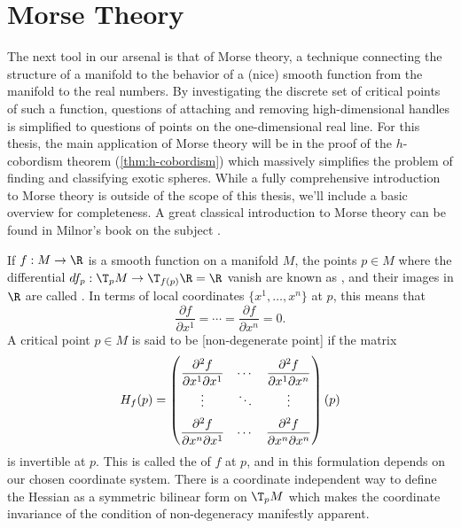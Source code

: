 \pagebreak
\section{Morse Theory}\label{sec:morse-theory}

The next tool in our arsenal is that of Morse theory, a technique connecting the structure of a manifold to the behavior of a (nice) smooth function from the manifold to the real numbers. 
By investigating the discrete set of critical points of such a function, questions of attaching and removing high-dimensional handles is simplified to questions of points on the one-dimensional real line. For this thesis, the main application of Morse theory will be in the proof of the $h$-cobordism theorem (\cref{thm:h-cobordism}) which massively simplifies the problem of finding and classifying exotic spheres. While a fully comprehensive introduction to Morse theory is outside of the scope of this thesis, we'll include a basic overview for completeness. A great classical introduction to Morse theory can be found in Milnor's book on the subject \cite{milnor1963morse}.

If $f : M \to \R$ is a smooth function on a manifold $M$, the points $p\in M$ where the differential $df_p : \T_p M \to \T_{f(p)} \R = \R$ vanish are known as , and their images in $\R$ are called . In terms of local coordinates $\{x^1,\ldots, x^n\}$ at $p$, this means that
\begin{equation}
	\frac{\partial f}{\partial x^1}=\cdots=\frac{\partial f}{\partial x^n} = 0.
\end{equation}
A critical point $p\in M$ is said to be [non-degenerate point] if the matrix
\begin{equation}
	\everymath={\displaystyle}
	\renewcommand*{\arraystretch}{2}
	H_f(p) = \begin{pmatrix}
		\frac{\partial^2 f}{\partial x^1\partial x^1} & \cdots &
		\frac{\partial^2 f}{\partial x^1\partial x^n}                   \\
		\vdots                                        & \ddots & \vdots \\
		\frac{\partial^2 f}{\partial x^n\partial x^1} & \cdots &
		\frac{\partial^2 f}{\partial x^n\partial x^n}                   \\
	\end{pmatrix}(p)
\end{equation}
is invertible at $p$. This is called the  of $f$ at $p$, and in this formulation depends on our chosen coordinate system.
There is a coordinate independent way to define the Hessian as a symmetric bilinear form on $\T_p M$ which makes the coordinate invariance of the condition of non-degeneracy manifestly apparent.

